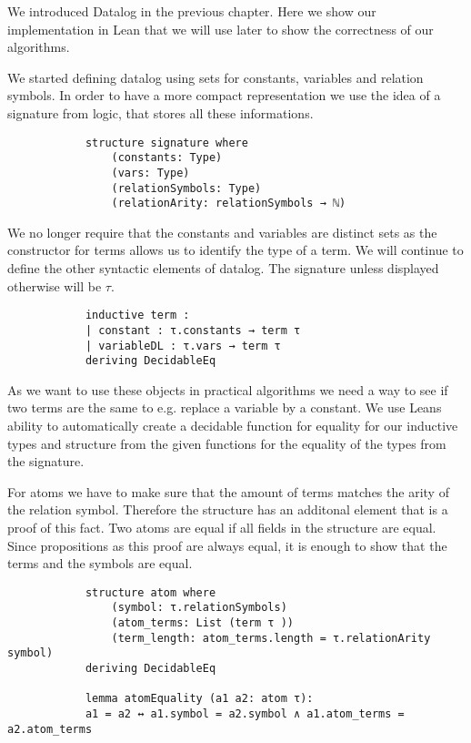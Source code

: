 \documentclass{article}
\begin{document}
        We introduced Datalog in the previous chapter. Here we show our implementation in Lean that we will use later to show the correctness of our algorithms.

        We started defining datalog using sets for constants, variables and relation symbols. In order to have a more compact representation we use the idea of a signature from logic, that stores all these informations.

        \begin{lstlisting}
            structure signature where
                (constants: Type)
                (vars: Type)
                (relationSymbols: Type)
                (relationArity: relationSymbols → ℕ)
        \end{lstlisting}

        We no longer require that the constants and variables are distinct sets as the constructor for terms allows us to identify the type of a term. We will continue to define the other syntactic elements of datalog. The signature unless displayed otherwise will be $\tau$.

        \begin{lstlisting}
            inductive term :
            | constant : τ.constants → term τ
            | variableDL : τ.vars → term τ
            deriving DecidableEq
        \end{lstlisting}

        As we want to use these objects in practical algorithms we need a way to see if two terms are the same to e.g. replace a variable by a constant. We use Leans ability to automatically create a decidable function for equality for our inductive types and structure from the given functions for the equality of the types from the signature. 
    
        For atoms we have to make sure that the amount of terms matches the arity of the relation symbol. Therefore the structure has an additonal element that is a proof of this fact. Two atoms are equal if all fields in the structure are equal. Since propositions as this proof are always equal, it is enough to show that the terms and the symbols are equal.

        \begin{lstlisting}
            structure atom where
                (symbol: τ.relationSymbols)
                (atom_terms: List (term τ ))
                (term_length: atom_terms.length = τ.relationArity symbol)
            deriving DecidableEq

            lemma atomEquality (a1 a2: atom τ): 
            a1 = a2 ↔ a1.symbol = a2.symbol ∧ a1.atom_terms = a2.atom_terms 

        \end{lstlisting}
\end{document}
